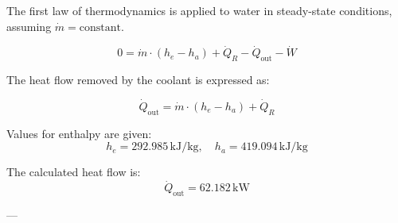 The first law of thermodynamics is applied to water in steady-state conditions, assuming \( \dot{m} = \text{constant} \).  

\[
0 = \dot{m} \cdot (h_e - h_a) + \dot{Q}_R - \dot{Q}_{\text{out}} - \dot{W}
\]

The heat flow removed by the coolant is expressed as:  

\[
\dot{Q}_{\text{out}} = \dot{m} \cdot (h_e - h_a) + \dot{Q}_R
\]

Values for enthalpy are given:  
\[
h_e = 292.985 \, \text{kJ/kg}, \quad h_a = 419.094 \, \text{kJ/kg}
\]

The calculated heat flow is:  
\[
\dot{Q}_{\text{out}} = 62.182 \, \text{kW}
\]

---